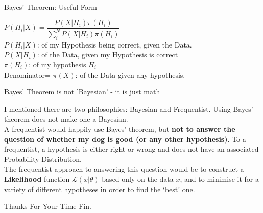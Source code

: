 \documentclass[10pt,sans,english,compress,xcolor=dvipsnames]{beamer}
\begin{document}
\begin{frame}[fragile]{Bayes' Theorem: Useful Form}


$P(H_i | X) = \dfrac{ P(X|H_i) \pi(H_i) } {  \sum\limits_i^N P(X | H_i) \pi(H_i) } $\\[2ex]
$P(H_i | X)$:  of my Hypothesis being correct, given the Data.\\[2ex]
$P(X | H_i)$:  of the Data, given my Hypothesis is correct\\[2ex]
$\pi(H_i)$:  of my hypothesis $H_i$\\[2ex]
Denominator= $\pi(X)$:  of the Data given any hypothesis.\\[2ex]


\end{frame} 


\begin{frame}[fragile]{Bayes' Theorem is not 'Bayesian' - it is just math}

I mentioned there are two philosophies: Bayesian and Frequentist. Using Bayes' theorem does not make one a Bayesian.\\[1ex]


A frequentist would happily use Bayes' theorem, but \textbf{not to answer the question of whether my dog is good (or any other hypothesis)}. To a frequentist, a hypothesis is either right or wrong and does not have an associated Probability Distribution.\\[1ex]

The frequentist approach to answering this question would be to construct a \textbf{Likelihood} function $ \mathcal{L}(x|\theta)$ based only on the data $x$, and to minimise it for a variety of different hypotheses in order to find the `best' one.

\small

\end{frame} 



\begin{frame}{Thanks For Your Time}
\center
\Huge
Fin.
\end{frame}
\end{document}
